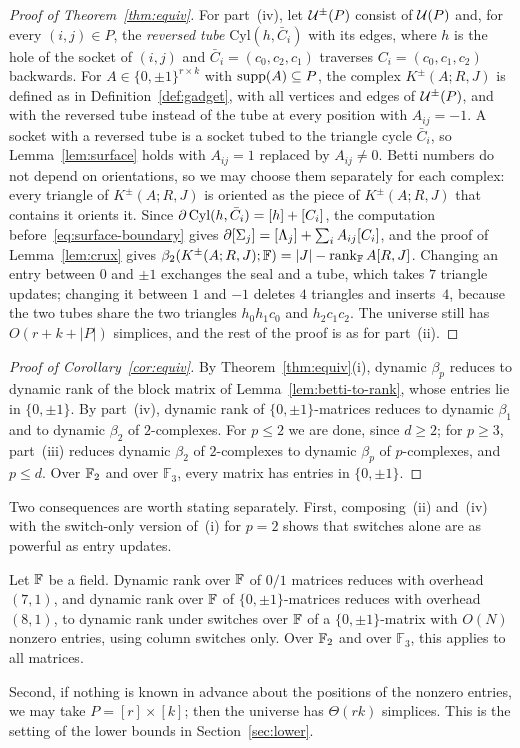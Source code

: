 \begin{proof}[Proof of Theorem~\ref{thm:equiv}]
For part~(iv), let $\mathcal{U}^{\pm}(P)$ consist of $\mathcal{U}(P)$ and, for every $(i,j)\in P$, the \emph{reversed tube} $\mathrm{Cyl}(h,\bar C_i)$ with its edges, where $h$ is the hole of the socket of $(i,j)$ and $\bar C_i=(c_0,c_2,c_1)$ traverses $C_i=(c_0,c_1,c_2)$ backwards.
For $A\in\{0,\pm1\}^{r\times k}$ with $\operatorname{supp}(A)\subseteq P$, the complex $K^{\pm}(A;R,J)$ is defined as in Definition~\ref{def:gadget}, with all vertices and edges of $\mathcal{U}^{\pm}(P)$, and with the reversed tube instead of the tube at every position with $A_{ij}=-1$.
A socket with a reversed tube is a socket tubed to the triangle cycle $\bar C_i$, so Lemma~\ref{lem:surface} holds with $A_{ij}=1$ replaced by $A_{ij}\neq0$.
Betti numbers do not depend on orientations, so we may choose them separately for each complex: every triangle of $K^{\pm}(A;R,J)$ is oriented as the piece of $K^{\pm}(A;R,J)$ that contains it orients it.
Since $\partial\,\mathrm{Cyl}(h,\bar C_i)=[h]+[C_i]$, the computation before~\eqref{eq:surface-boundary} gives $\partial[\Sigma_j]=[\Lambda_j]+\sum_iA_{ij}[C_i]$, and the proof of Lemma~\ref{lem:crux} gives $\beta_2(K^{\pm}(A;R,J);\mathbb{F})=|J|-\operatorname{rank}_{\mathbb{F}}A[R,J]$.
Changing an entry between $0$ and $\pm1$ exchanges the seal and a tube, which takes $7$ triangle updates; changing it between $1$ and $-1$ deletes $4$ triangles and inserts~$4$, because the two tubes share the two triangles $h_0h_1c_0$ and $h_2c_1c_2$.
The universe still has $O(r+k+|P|)$ simplices, and the rest of the proof is as for part~(ii).
\end{proof}

\begin{proof}[Proof of Corollary~\ref{cor:equiv}]
By Theorem~\ref{thm:equiv}(i), dynamic $\beta_p$ reduces to dynamic rank of the block matrix of Lemma~\ref{lem:betti-to-rank}, whose entries lie in $\{0,\pm1\}$.
By part~(iv), dynamic rank of $\{0,\pm1\}$-matrices reduces to dynamic $\beta_1$ and to dynamic $\beta_2$ of $2$-complexes.
For $p\le2$ we are done, since $d\ge2$; for $p\ge3$, part~(iii) reduces dynamic $\beta_2$ of $2$-complexes to dynamic $\beta_p$ of $p$-complexes, and $p\le d$.
Over $\mathbb{F}_2$ and over $\mathbb{F}_3$, every matrix has entries in $\{0,\pm1\}$.
\end{proof}

Two consequences are worth stating separately.
First, composing~(ii) and~(iv) with the switch-only version of~(i) for $p=2$ shows that switches alone are as powerful as entry updates.

\begin{corollary}\label{cor:switch-only}
Let $\mathbb{F}$ be a field.
Dynamic rank over $\mathbb{F}$ of $0/1$ matrices reduces with overhead $(7,1)$, and dynamic rank over $\mathbb{F}$ of $\{0,\pm1\}$-matrices reduces with overhead $(8,1)$, to dynamic rank under switches over $\mathbb{F}$ of a $\{0,\pm1\}$-matrix with $O(N)$ nonzero entries, using column switches only.
Over $\mathbb{F}_2$ and over $\mathbb{F}_3$, this applies to all matrices.
\end{corollary}

Second, if nothing is known in advance about the positions of the nonzero entries, we may take $P=[r]\times[k]$; then the universe has $\Theta(rk)$ simplices.
This is the setting of the lower bounds in Section~\ref{sec:lower}.


